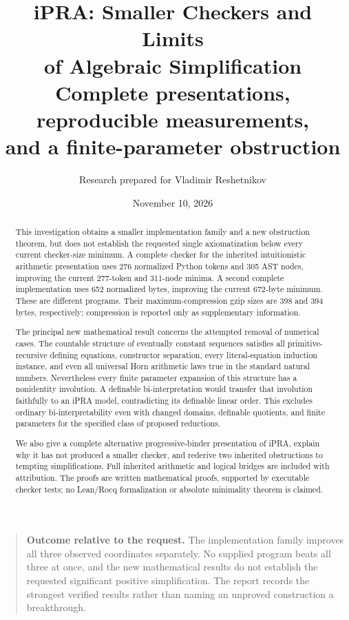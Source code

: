 \documentclass[11pt,letterpaper]{article}
\title{\textbf{iPRA: Smaller Checkers and Limits\\of Algebraic Simplification}\\[0.5em]
\large Complete presentations, reproducible measurements,\\and a finite-parameter obstruction}
\author{Research prepared for Vladimir Reshetnikov}
\date{November 10, 2026}
\theoremstyle{definition}\newtheorem{definition}[theorem]{Definition}
\theoremstyle{remark}\newtheorem{remark}[theorem]{Remark}
\begin{document}
\maketitle
\begin{abstract}
This investigation obtains a smaller implementation family and a new
obstruction theorem, but does not establish the requested single
axiomatization below every current checker-size minimum. A complete
checker for the inherited intuitionistic arithmetic presentation uses
276 normalized Python tokens and 305 AST nodes, improving the current
277-token and 311-node minima. A second complete implementation uses
652 normalized bytes, improving the current 672-byte minimum. These
are different programs. Their maximum-compression gzip sizes are
398 and 394 bytes, respectively; compression is reported only as
supplementary information.

The principal new mathematical result concerns the attempted removal
of numerical cases. The countable structure of eventually constant
sequences satisfies all primitive-recursive defining equations,
constructor separation, every literal-equation induction instance,
and even all universal Horn arithmetic laws true in the standard
natural numbers. Nevertheless every finite parameter expansion of
this structure has a nonidentity involution. A definable
bi-interpretation would transfer that involution faithfully to an
iPRA model, contradicting its definable linear order. This excludes
ordinary bi-interpretability even with changed domains, definable
quotients, and finite parameters for the specified class of proposed
reductions.

We also give a complete alternative progressive-binder presentation
of iPRA, explain why it has not produced a smaller checker, and rederive
two inherited obstructions to tempting simplifications. Full inherited
arithmetic and logical bridges are included with attribution. The
proofs are written mathematical proofs, supported by executable
checker tests; no Lean/Rocq formalization or absolute minimality
theorem is claimed.
\end{abstract}
\begin{quote}
\textbf{Outcome relative to the request.} The implementation family
improves all three observed coordinates separately. No supplied
program beats all three at once, and the new mathematical results
do not establish the requested significant positive simplification.
The report records the strongest verified results rather than naming
an unproved construction a breakthrough.
\end{quote}
\clearpage
\setcounter{tocdepth}{2}\tableofcontents
\clearpage

\clearpage

\clearpage

\clearpage


\clearpage
\appendix
\end{document}
